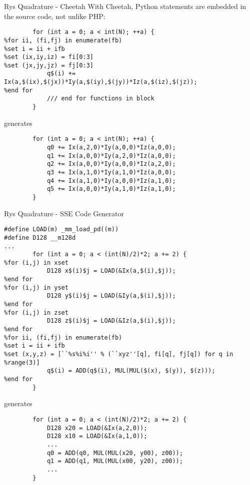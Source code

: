 \documentclass{beamer}
\begin{document}
\begin{frame}[fragile]{Rys Quadrature - Cheetah}
  With Cheetah, Python statements are embedded in the source code, not
  unlike PHP:
\begin{lstlisting}
        for (int a = 0; a < int(N); ++a) {
%for ii, (fi,fj) in enumerate(fb)
%set i = ii + ifb
%set (ix,iy,iz) = fi[0:3]
%set (jx,jy,jz) = fj[0:3]
            q$(i) += Ix(a,$(ix),$(jx))*Iy(a,$(iy),$(jy))*Iz(a,$(iz),$(jz));
%end for
            /// end for functions in block
        }
\end{lstlisting}
generates
\begin{lstlisting}
        for (int a = 0; a < int(N); ++a) {
            q0 += Ix(a,2,0)*Iy(a,0,0)*Iz(a,0,0);
            q1 += Ix(a,0,0)*Iy(a,2,0)*Iz(a,0,0);
            q2 += Ix(a,0,0)*Iy(a,0,0)*Iz(a,2,0);
            q3 += Ix(a,1,0)*Iy(a,1,0)*Iz(a,0,0);
            q4 += Ix(a,1,0)*Iy(a,0,0)*Iz(a,1,0);
            q5 += Ix(a,0,0)*Iy(a,1,0)*Iz(a,1,0);
        }
\end{lstlisting}
\end{frame}


\begin{frame}[fragile]{Rys Quadrature - SSE Code Generator}
\begin{lstlisting}
#define LOAD(m) _mm_load_pd((m))
#define D128 __m128d
...
        for (int a = 0; a < (int(N)/2)*2; a += 2) {
%for (i,j) in xset
            D128 x$(i)$j = LOAD(&Ix(a,$(i),$j));
%end for
%for (i,j) in yset
            D128 y$(i)$j = LOAD(&Iy(a,$(i),$j));
%end for
%for (i,j) in zset
            D128 z$(i)$j = LOAD(&Iz(a,$(i),$j));
%end for
%for ii, (fi,fj) in enumerate(fb)
%set i = ii + ifb
%set (x,y,z) = [``%s%i%i'' % (``xyz''[q], fi[q], fj[q]) for q in %range(3)]
            q$(i) = ADD(q$(i), MUL(MUL($(x), $(y)), $(z)));
%end for
        }
\end{lstlisting}
generates
\begin{lstlisting}
        for (int a = 0; a < (int(N)/2)*2; a += 2) {
            D128 x20 = LOAD(&Ix(a,2,0));
            D128 x10 = LOAD(&Ix(a,1,0));
            ...
            q0 = ADD(q0, MUL(MUL(x20, y00), z00));
            q1 = ADD(q1, MUL(MUL(x00, y20), z00));
            ...
        }
\end{lstlisting}
\end{frame}
\end{document}
